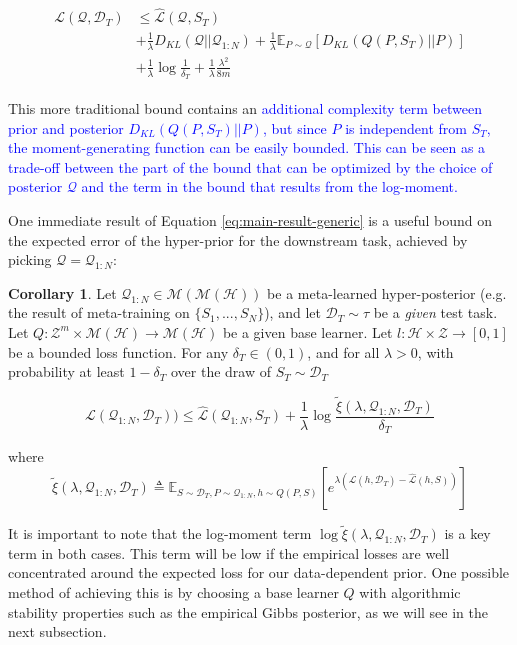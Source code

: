 \documentclass{article}
\theoremstyle{definition}
\newtheorem{corollary}[theorem]{Corollary}
\newcommand{\Expect}[2]{\mathbb{E}_{#1}\left [#2 \right ]}
\newcommand{\LFe}[1]{\textcolor{blue}{#1}}
\begin{document}
\begin{align*}
\begin{split}
\mathcal{L}(\mathcal{Q}, \mathcal{D}_T) &\leq \hat{\mathcal{L}}(\mathcal{Q}, S_T) \\
&+ \frac{1}{\lambda}D_{KL}(\mathcal{Q}||\mathcal{Q}_{1:N}) + \frac{1}{\lambda}\Expect{P\sim \mathcal{Q}}{D_{KL}(Q(P,S_T)||P)}\\
&+\frac{1}{\lambda}\log\frac{1}{\delta_T}+\frac{1}{\lambda}\frac{\lambda^2}{8m}
\end{split}
\end{align*}

This more traditional bound contains an \LFe{additional complexity term between prior and posterior $D_{KL}(Q(P,S_T)||P)$, but since $P$ is independent from $S_T$, the moment-generating function can be easily bounded. This can be seen as a trade-off between the part of the bound that can be optimized by the choice of posterior $\mathcal{Q}$ and the term in the bound that results from the log-moment.}

One immediate result of Equation \ref{eq:main-result-generic} is a useful bound on the expected error of the hyper-prior for the downstream task, achieved by picking $\mathcal{Q}=\mathcal{Q}_{1:N}$:

\begin{corollary} \label{thm:corollary-base}
	Let $\mathcal{Q}_{1:N}\in \mathcal{M}(\mathcal{M}(\mathcal{H}))$ be a meta-learned hyper-posterior (e.g. the result of meta-training on $\{S_1,...,S_N\}$), and let $\mathcal{D}_T\sim \tau$ be a \emph{given} test task. Let $Q: \mathcal{Z}^m\times\mathcal{M}(\mathcal{H})\rightarrow \mathcal{M}(\mathcal{H})$ be a given base learner. Let $l: \mathcal{H}\times \mathcal{Z}\rightarrow [0, 1]$ be a bounded loss function.
	For any $\delta_T \in (0,1)$, and for all $\lambda>0$, with probability at least $1-\delta_T$ over the draw of $S_T\sim \mathcal{D}_T$
	
	$$\mathcal{L}(\mathcal{Q}_{1:N}, \mathcal{D}_T)) \leq \hat{\mathcal{L}}(\mathcal{Q}_{1:N}, S_T)
	+\frac{1}{\lambda}\log\frac{\tilde{\xi}(\lambda,\mathcal{Q}_{1:N},\mathcal{D}_T)}{\delta_T}$$
	
	where 
	$$\tilde{\xi}(\lambda,\mathcal{Q}_{1:N},\mathcal{D}_T)\triangleq \Expect{S\sim \mathcal{D}_T, P\sim \mathcal{Q}_{1:N}, h\sim Q(P,S)}{e^{\lambda\left (\mathcal{L}(h, \mathcal{D}_T)-\hat{\mathcal{L}}(h, S)\right )}}$$
\end{corollary}

It is important to note that the log-moment term $\log\tilde{\xi}(\lambda,\mathcal{Q}_{1:N},\mathcal{D}_T)$ is a key term in both cases. This term will be low if the empirical losses are well concentrated around the expected loss for our data-dependent prior. One possible method of achieving this is by choosing a base learner $Q$ with algorithmic stability properties such as the empirical Gibbs posterior, as we will see in the next subsection.
\end{document}
